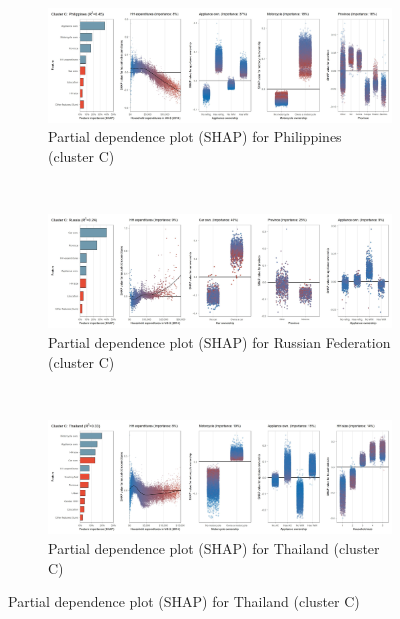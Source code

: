 \begin{figure}[ht!]\ContinuedFloat
    \centering
   \begin{subfigure}[b]{\textwidth}
   \centering
         \caption{Partial dependence plot (SHAP) for Philippines (cluster C)}
         \label{fig:5b_PHL}
         \includegraphics[width=\textwidth]{Figure 5b/Figure_5b_PHL}    
         \end{subfigure}
    \\
    \vspace{0.5cm}
   \begin{subfigure}[b]{\textwidth}
   \centering
         \caption{Partial dependence plot (SHAP) for Russian Federation (cluster C)}
         \label{fig:5b_RUS}
         \includegraphics[width=\textwidth]{Figure 5b/Figure_5b_RUS} 
    \end{subfigure}
    \\
    \vspace{0.5cm}
   \begin{subfigure}[b]{\textwidth}
   \centering
         \caption{Partial dependence plot (SHAP) for Thailand (cluster C)}
         \label{fig:5b_THA}
         \includegraphics[width=\textwidth]{Figure 5b/Figure_5b_THA} 

\end{subfigure}
\end{figure}

